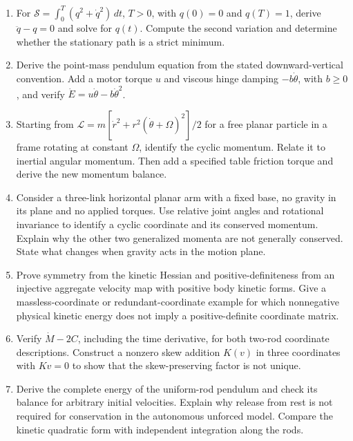 \begin{enumerate}
\item\label{ex:lagrangian_1} For $\mathcal S=\int_0^T(q^2+\dot q^2)\,dt$, $T>0$, with $q(0)=0$ and $q(T)=1$, derive $\ddot q-q=0$ and solve for $q(t)$. Compute the second variation and determine whether the stationary path is a strict minimum.

\item\label{ex:lagrangian_2} Derive the point-mass pendulum equation from the stated downward-vertical convention. Add a motor torque $u$ and viscous hinge damping $-b\dot\theta$, with $b\geq0$, and verify $\dot E=u\dot\theta-b\dot\theta^2$.

\item\label{ex:lagrangian_3} Starting from $\mathcal L=m[\dot r^2+r^2(\dot\theta+\Omega)^2]/2$ for a free planar particle in a frame rotating at constant $\Omega$, identify the cyclic momentum. Relate it to inertial angular momentum. Then add a specified table friction torque and derive the new momentum balance.

\item\label{ex:lagrangian_4} Consider a three-link horizontal planar arm with a fixed base, no gravity in its plane and no applied torques. Use relative joint angles and rotational invariance to identify a cyclic coordinate and its conserved momentum. Explain why the other two generalized momenta are not generally conserved. State what changes when gravity acts in the motion plane.

\item\label{ex:lagrangian_5} Prove symmetry from the kinetic Hessian and positive-definiteness from an injective aggregate velocity map with positive body kinetic forms. Give a massless-coordinate or redundant-coordinate example for which nonnegative physical kinetic energy does not imply a positive-definite coordinate matrix.

\item\label{ex:lagrangian_6} Verify $\dot M-2C$, including the time derivative, for both two-rod coordinate descriptions. Construct a nonzero skew addition $K(v)$ in three coordinates with $Kv=0$ to show that the skew-preserving factor is not unique.

\item\label{ex:lagrangian_7} Derive the complete energy of the uniform-rod pendulum and check its balance for arbitrary initial velocities. Explain why release from rest is not required for conservation in the autonomous unforced model. Compare the kinetic quadratic form with independent integration along the rods.


\end{enumerate}
